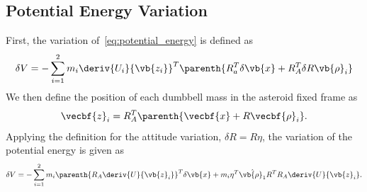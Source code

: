 \documentclass[11pt, reqno]{article}    %
\begin{document}
\subsection{Potential Energy Variation}
First, the variation of~\cref{eq:potential_energy} is defined as
\begin{align*}
    \delta V = - \sum_{i=1}^{2} m_i \deriv{U_i}{\vb{z_i}}^T \parenth{ R_a^T \delta \vb{x} + R_A^T \delta R \vb{\rho}_i}
\end{align*}
We then define the position of each dumbbell mass in the asteroid fixed frame as
\begin{align}\label{eq:pos_asteroid_frame}
    \vecbf{z}_i = R_A^T \parenth{\vecbf{x} + R \vecbf{\rho}_i}.
\end{align}
Applying the definition for the attitude variation, \(\delta R = R \eta \), the variation of the potential energy is given as
\begin{align}\label{eq:potential_variation}
    \delta V = -\sum_{i=1}^2  m_i \parenth{R_A \deriv{U}{\vb{z}_i} }^T \delta \vb{x} + m_i \eta^T \hat{\vb{\rho}_1} R^T R_A \deriv{U}{\vb{z}_i}.
\end{align}
\end{document}

